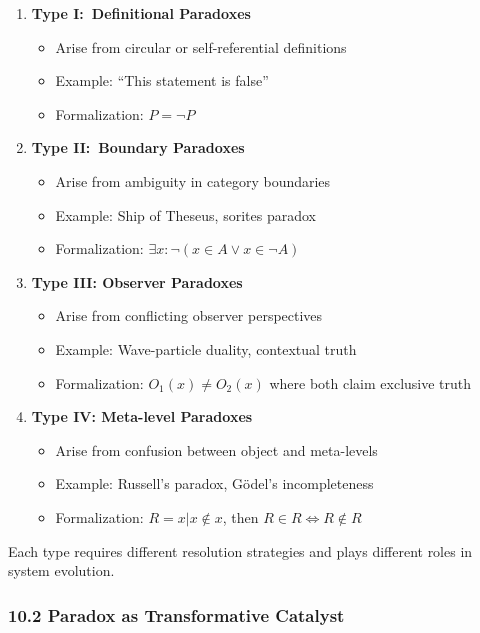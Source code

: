 \documentclass[12pt]{article}
\providecommand{\tightlist}{%
  \setlength{\itemsep}{0pt}\setlength{\parskip}{0pt}}
\begin{document}
\begin{enumerate}
\def\labelenumi{\arabic{enumi}.}
\item
  \textbf{Type I:\ Definitional Paradoxes}

  \begin{itemize}
  \tightlist
  \item
    Arise from circular or self-referential definitions
  \item
    Example: ``This statement is false''
  \item
    Formalization: \(P = \neg P\)
  \end{itemize}
\item
  \textbf{Type II:\ Boundary Paradoxes}

  \begin{itemize}
  \tightlist
  \item
    Arise from ambiguity in category boundaries
  \item
    Example: Ship of Theseus, sorites paradox
  \item
    Formalization: \(\exists x: \neg(x \in A \lor x \in \neg A)\)
  \end{itemize}
\item
  \textbf{Type III: Observer Paradoxes}

  \begin{itemize}
  \tightlist
  \item
    Arise from conflicting observer perspectives
  \item
    Example: Wave-particle duality, contextual truth
  \item
    Formalization: \(O_1(x) \neq O_2(x)\) where both claim exclusive
    truth
  \end{itemize}
\item
  \textbf{Type IV: Meta-level Paradoxes}

  \begin{itemize}
  \tightlist
  \item
    Arise from confusion between object and meta-levels
  \item
    Example: Russell's paradox, Gödel's incompleteness
  \item
    Formalization: \(R = {x | x \notin x}\), then
    \(R \in R \iff R \notin R\)
  \end{itemize}
\end{enumerate}

Each type requires different resolution strategies and plays different
roles in system evolution.

\subsubsection{10.2 Paradox as Transformative
Catalyst}\label{paradox-as-transformative-catalyst}
\end{document}
